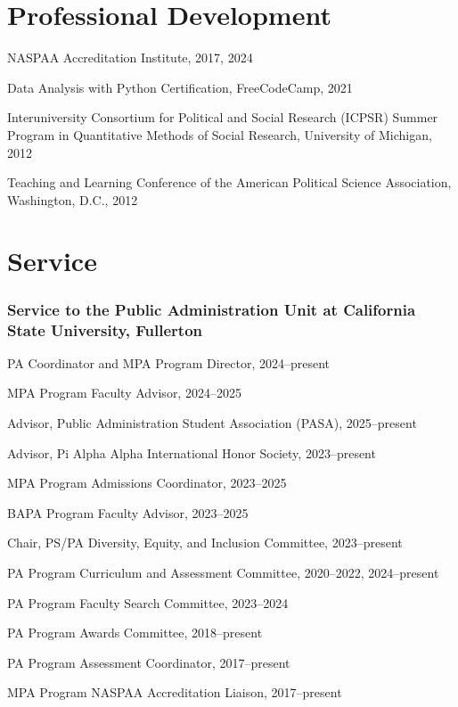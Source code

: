 \documentclass[12pt,letterpaper]{article}
\renewenvironment{itemize}{
  \begin{list}{}{
    \setlength{\leftmargin}{1.5em}
    \setlength{\itemsep}{0.25em}
    \setlength{\parskip}{0pt}
    \setlength{\parsep}{0.25em}
  }
}{
  \end{list}
}
\begin{document}
\section*{Professional Development}
\begin{itemize}\leftmargin=2pt\itemindent=-15pt
  \item NASPAA Accreditation Institute, 2017, 2024
  \item Data Analysis with Python Certification, FreeCodeCamp, 2021
  \item Interuniversity Consortium for Political and Social Research (ICPSR) Summer Program in Quantitative Methods of Social Research, University of Michigan, 2012
  \item Teaching and Learning Conference of the American Political Science Association, Washington, D.C., 2012
\end{itemize}

\section*{Service}

\subsubsection*{Service to the Public Administration Unit at California State University, Fullerton}
\begin{itemize}\leftmargin=2pt\itemindent=-15pt
    \item PA Coordinator and MPA Program Director, 2024--present
    \item MPA Program Faculty Advisor, 2024--2025
    \item Advisor, Public Administration Student Association (PASA), 2025--present
    \item Advisor, Pi Alpha Alpha International Honor Society, 2023--present
    \item MPA Program Admissions Coordinator, 2023--2025
    \item BAPA Program Faculty Advisor, 2023--2025
    \item Chair, PS/PA Diversity, Equity, and Inclusion Committee, 2023--present
    \item PA Program Curriculum and Assessment Committee, 2020--2022, 2024--present
    \item PA Program Faculty Search Committee, 2023--2024
    \item PA Program Awards Committee, 2018--present
    \item PA Program Assessment Coordinator, 2017--present
    \item MPA Program NASPAA Accreditation Liaison, 2017--present
\end{itemize}
\end{document}
